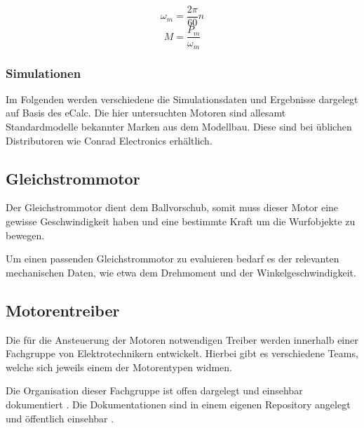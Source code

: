 \[ \omega_m = \frac{2\pi}{60} n \]
\[ M = \frac{P_m}{\omega_m} \]

\subsubsection{Simulationen}
Im Folgenden werden verschiedene die Simulationsdaten und Ergebnisse
dargelegt auf Basis des eCalc. Die hier untersuchten Motoren sind
allesamt Standardmodelle bekannter Marken aus dem Modellbau. Diese
sind bei üblichen Distributoren wie Conrad Electronics erhältlich.

\newpage


\newpage


\newpage


\newpage

\newpage

\subsection{Gleichstrommotor}
Der Gleichstrommotor dient dem Ballvorschub, somit muss dieser Motor
eine gewisse Geschwindigkeit haben und eine bestimmte Kraft um die
Wurfobjekte zu bewegen.

Um einen passenden Gleichstrommotor zu evaluieren bedarf es der relevanten
mechanischen Daten, wie etwa dem Drehmoment und der Winkelgeschwindigkeit.

\subsection{Motorentreiber}
Die für die Ansteuerung der Motoren notwendigen Treiber werden innerhalb
einer Fachgruppe von Elektrotechnikern entwickelt. Hierbei gibt es
verschiedene Teams, welche sich jeweils einem der Motorentypen widmen.

Die Organisation dieser Fachgruppe ist offen dargelegt und einsehbar
dokumentiert \cite{pren-et}. Die Dokumentationen sind in einem eigenen
Repository angelegt und öffentlich einsehbar \cite{pren-et-doc}.